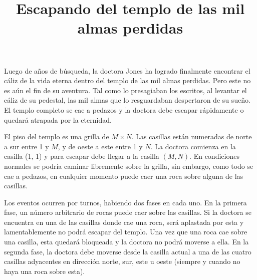 \documentclass{oci}
\title{Escapando del templo de las mil almas perdidas}
\begin{document}
\begin{problemDescription}
  Luego de años de búsqueda, la doctora Jones ha logrado finalmente encontrar el cáliz de la vida
  eterna dentro del templo de las mil almas perdidas.
  Pero este no es aún el fin de su aventura.
  Tal como lo presagiaban los escritos, al levantar el cáliz de su pedestal, las mil almas que lo
  resguardaban despertaron de su sueño.
  El templo completo se cae a pedazos y la doctora debe escapar rápidamente o quedará atrapada por
  la eternidad.

  El piso del templo es una grilla de $M\times N$.
  Las casillas están numeradas de norte a sur entre 1 y $M$, y de oeste a este entre 1 y $N$.
  La doctora comienza en la casilla (1, 1) y para escapar debe llegar a la casilla $(M, N)$.
  En condiciones normales se podría caminar libremente sobre la grilla, sin embargo, como todo se
  cae a pedazos, en cualquier momento puede caer una roca sobre alguna de las casillas.

  Los eventos ocurren por turnos, habiendo dos fases en cada uno.
  En la primera fase, un número arbitrario de rocas puede caer sobre las casillas.
  Si la doctora se encuentra en una de las casillas donde cae una roca, será aplastada por esta y
  lamentablemente no podrá escapar del templo.
  Una vez que una roca cae sobre una casilla, esta quedará bloqueada y la doctora no podrá moverse
  a ella.
  En la segunda fase, la doctora debe moverse desde la casilla actual a una de las cuatro casillas
  adyacentes en dirección norte, sur, este u oeste (siempre y cuando no haya una roca sobre esta).


\end{problemDescription}
\end{document}
